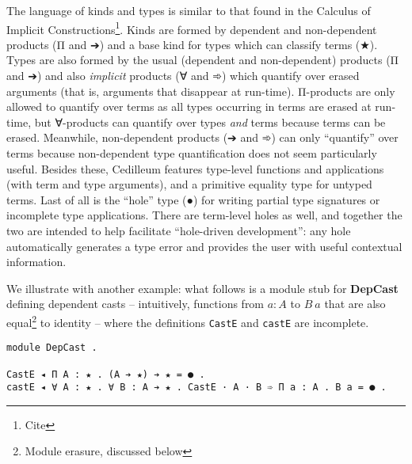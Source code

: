 \documentclass{article}
\begin{document}
The language of kinds and types is similar to that found in the Calculus of
Implicit Constructions\footnote{Cite}. Kinds are formed by dependent and
non-dependent products (Π and ➔) and a base kind for types which can classify
terms (★). Types are also formed by the usual (dependent and non-dependent)
products (Π and ➔) and also \textit{implicit} products (∀ and ➾) which quantify
over erased arguments (that is, arguments that disappear at run-time).
Π-products are only allowed to quantify over terms as all types occurring in
terms are erased at run-time, but ∀-products can quantify over types
\textit{and} terms because terms can be erased. Meanwhile, non-dependent
products (➔ and ➾) can only ``quantify'' over terms because non-dependent type
quantification does not seem particularly useful. Besides these, Cedilleum
features type-level functions and applications (with term and type arguments),
and a primitive equality type for untyped terms. Last of all is the ``hole''
type (●) for writing partial type signatures or incomplete type applications.
There are term-level holes as well, and together the two are intended to help
facilitate ``hole-driven development'': any hole automatically generates a type
error and provides the user with useful contextual information.

We illustrate with another example: what follows is a module stub for
\textbf{DepCast} defining dependent casts -- intuitively, functions from $a : A$
to $B\ a$ that are also equal\footnote{Module erasure, discussed below} to
identity -- where the definitions \texttt{CastE} and \texttt{castE} are
incomplete.

\begin{verbatim}
module DepCast .

CastE ◂ Π A : ★ . (A ➔ ★) ➔ ★ = ● .
castE ◂ ∀ A : ★ . ∀ B : A ➔ ★ . CastE · A · B ➾ Π a : A . B a = ● .
\end{verbatim}
  
\end{document}

